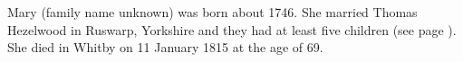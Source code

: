
Mary (family name unknown) was born about 1746.  She married Thomas Hezelwood in Ruswarp, Yorkshire and they had at least five children (see page \pageref{Thomas_Hezelwood}).
She died in Whitby on 11 January 1815 at the age of 69.\cite{MaryHezelwoodDeath}

